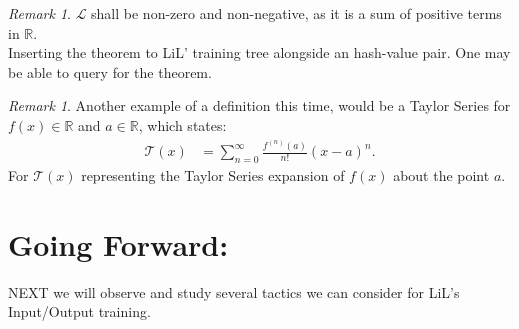 \documentclass[10pt]{article}
\theoremstyle{plain}
\theoremstyle{definition}
\theoremstyle{remark}
\newtheorem{remark}[theorem]{Remark}
\begin{document}
\begin{remark}
    $\mathcal{L}$ shall be non-zero and non-negative, as it is a sum of positive terms in $\mathbb{R}$.\\
	Inserting the theorem to LiL' training tree alongside an hash-value pair. One may be able to query for the theorem.
\end{remark}

\begin{remark}
	Another example of a definition this time, would be a Taylor Series for $f(x) \in \mathbb{R}$ and $a \in \mathbb{R}$, which states:
	\begin{align*}
		\mathcal{T}(x) &= \sum_{n=0}^{\infty} \frac{f^{(n)}(a)}{n!} (x-a)^n.
	\end{align*}
	For $\mathcal{T}(x)$ representing the Taylor Series expansion of $f(x)$ about the point $a$.
\end{remark}

\section{Going Forward:}

\lettrine[lines=1, lhang=0.1, loversize=0.2]{N}EXT we will observe and study several tactics we can consider for LiL's Input/Output training.

\nocite{*}



\end{document}
